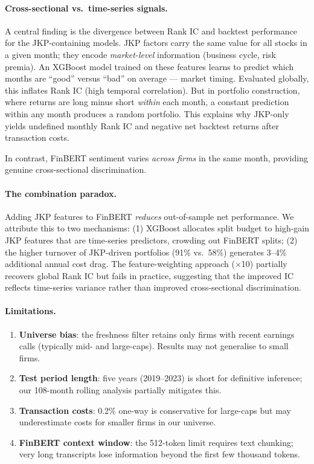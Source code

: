 \documentclass[11pt, a4paper]{article}
\begin{document}
\paragraph{Cross-sectional vs.\ time-series signals.}
A central finding is the divergence between Rank IC and backtest performance
for the JKP-containing models.
JKP factors carry the same value for all stocks in a given month; they encode
\textit{market-level} information (business cycle, risk premia).
An XGBoost model trained on these features learns to predict which months are
``good'' versus ``bad'' on average --- market timing.
Evaluated globally, this inflates Rank IC (high temporal correlation).
But in portfolio construction, where returns are long minus short
\textit{within} each month, a constant prediction within any month produces
a random portfolio.
This explains why JKP-only yields undefined monthly Rank IC and negative net backtest
returns after transaction costs.

In contrast, FinBERT sentiment varies \textit{across firms} in the same month,
providing genuine cross-sectional discrimination.

\paragraph{The combination paradox.}
Adding JKP features to FinBERT \textit{reduces} out-of-sample net performance.
We attribute this to two mechanisms: (1) XGBoost allocates split budget to
high-gain JKP features that are time-series predictors, crowding out FinBERT
splits; (2) the higher turnover of JKP-driven portfolios (91\% vs.\ 58\%)
generates 3--4\% additional annual cost drag.
The feature-weighting approach ($\times$10) partially recovers global Rank IC
but fails in practice, suggesting that the improved IC reflects time-series
variance rather than improved cross-sectional discrimination.

\paragraph{Limitations.}
\begin{enumerate}[noitemsep]
    \item \textbf{Universe bias}: the freshness filter retains only firms with
          recent earnings calls (typically mid- and large-caps).
          Results may not generalise to small firms.
    \item \textbf{Test period length}: five years (2019--2023) is short for
          definitive inference; our 108-month rolling analysis partially mitigates this.
    \item \textbf{Transaction costs}: 0.2\% one-way is conservative for large-caps
          but may underestimate costs for smaller firms in our universe.
    \item \textbf{FinBERT context window}: the 512-token limit requires text
          chunking; very long transcripts lose information beyond the first
          few thousand tokens.
\end{enumerate}
\end{document}
